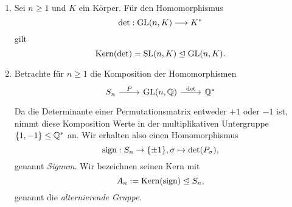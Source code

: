 \documentclass{book}
\begin{document}
\begin{exas}
    \label{exas:kern}
    \begin{enumerate}
        \item {}Sei $n \ge 1$ und $K$ ein Körper. Für den Homomorphismus
            \[
                \det: \operatorname{GL}(n,K) \longrightarrow K^*
            \]
            gilt
            \[
                \operatorname{Kern}(\det) = \operatorname{SL}(n,K) \trianglelefteq \operatorname{GL}(n,K).
            \]
        \item Betrachte für $n \ge 1$ die Komposition der Homomorphismen
            \[
            \begin{tikzcd}
                S_n \ar{r}{P} & \GL(n,\QQ) \ar{r}{\det} & \QQ^*
            \end{tikzcd}
            \]
            Da die Determinante einer Permutationsmatrix entweder $+1$ oder
            $-1$ ist, nimmt diese Komposition Werte in der multiplikativen
            Untergruppe $\{1,-1\} \le \mathbb{Q}^*$ an. Wir erhalten also
            einen Homomorphismus
            \[
                \operatorname{sign}: S_n \to \{\pm 1\}, \sigma \mapsto \det(P_{\sigma}),
            \]
            genannt \emph{Signum}. Wir bezeichnen seinen Kern mit
            \[
                A_n := \operatorname{Kern}(\operatorname{sign}) \trianglelefteq S_n,
            \]
            genannt die \emph{alternierende Gruppe}.
    \end{enumerate}
\end{exas}
\end{document}
